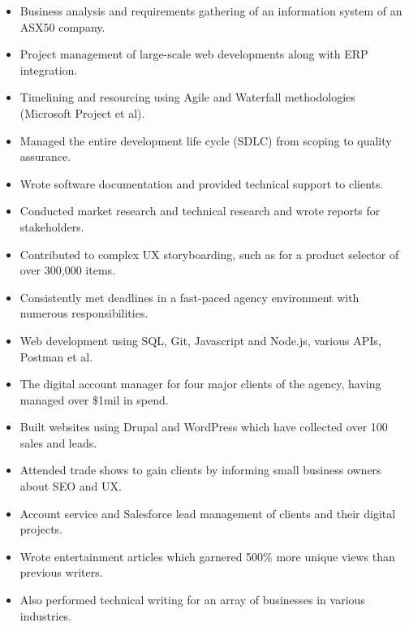 \documentclass{main}
\begin{document}
\begin{flushleft}


    \begin{itemize}
    \item Business analysis and requirements gathering of an information system of an ASX50 company.
    \item Project management of large-scale web developments along with ERP integration.
    \item Timelining and resourcing using Agile and Waterfall methodologies (Microsoft Project et al).
    \item Managed the entire development life cycle (SDLC) from scoping to quality assurance.
    \item Wrote software documentation and provided technical support to clients.
    \item Conducted market research and technical research and wrote reports for stakeholders.
    \item Contributed to complex UX storyboarding, such as for a product selector of over 300,000 items.
    \item Consistently met deadlines in a fast-paced agency environment with numerous responsibilities.
    \item Web development using SQL, Git, Javascript and Node.js, various APIs, Postman et al.
    \item The digital account manager for four major clients of the agency, having managed over \$1mil in spend.
    \end{itemize}


    \begin{itemize}
    \item Built websites using Drupal and WordPress which have collected over 100 sales and leads.
    \item Attended trade shows to gain clients by informing small business owners about SEO and UX.
    \end{itemize}


    \begin{itemize}
    \item Account service and Salesforce lead management of clients and their digital projects.
    \item Wrote entertainment articles which garnered 500\% more unique views than previous writers.
    \item Also performed technical writing for an array of businesses in various industries.
    \end{itemize}

\end{flushleft}
\end{document}
